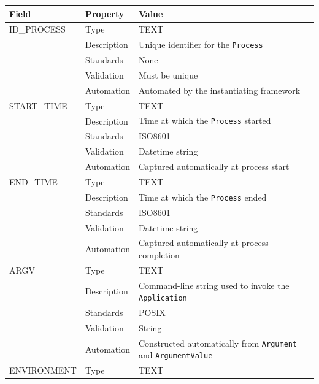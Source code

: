 \documentclass[
]{article}
\newcounter{none}
\begin{document}
{\def\LTcaptype{none} 
\begin{longtable}[]{@{}
  >{\raggedright\arraybackslash}p{}
  >{\raggedright\arraybackslash}p{}
  >{\raggedright\arraybackslash}p{}@{}}
\toprule\noalign{}
\begin{minipage}[b]{\linewidth}\raggedright
Field
\end{minipage} & \begin{minipage}[b]{\linewidth}\raggedright
Property
\end{minipage} & \begin{minipage}[b]{\linewidth}\raggedright
Value
\end{minipage} \\
\midrule\noalign{}
\endhead
\bottomrule\noalign{}
\endlastfoot
ID\_PROCESS & Type & TEXT \\
& Description & Unique identifier for the \texttt{Process} \\
& Standards & None \\
& Validation & Must be unique \\
& Automation & Automated by the instantiating framework \\
START\_TIME & Type & TEXT \\
& Description & Time at which the \texttt{Process} started \\
& Standards & ISO8601 \\
& Validation & Datetime string \\
& Automation & Captured automatically at process start \\
END\_TIME & Type & TEXT \\
& Description & Time at which the \texttt{Process} ended \\
& Standards & ISO8601 \\
& Validation & Datetime string \\
& Automation & Captured automatically at process completion \\
ARGV & Type & TEXT \\
& Description & Command-line string used to invoke the
\texttt{Application} \\
& Standards & POSIX \\
& Validation & String \\
& Automation & Constructed automatically from \texttt{Argument} and
\texttt{ArgumentValue} \\
ENVIRONMENT & Type & TEXT \\

\end{longtable}}
\end{document}
